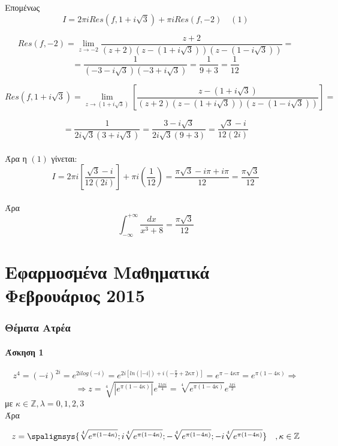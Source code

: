 \documentclass[12pt]{article}
\begin{document}
Επομένως $$ Ι= 2 \pi i Res(f,1+i\sqrt{3})+ \pi i Res(f,-2)\quad (1) $$

$$  Res(f,-2)=\lim_{z\to -2}\frac{z+2}{(z+2)(z-(1+i\sqrt{3}))(z-(1-i\sqrt{3}))}=$$
$$=\frac{1}{(-3-i\sqrt{3})(-3+i\sqrt{3})}=\frac{1}{9+3}=\frac{1}{12}$$

$$ Res(f,1+i\sqrt{3})=\lim_{z\to (1+i\sqrt{3})} \left[ \frac{z-(1+i\sqrt{3})}{(z+2)(z-(1+i\sqrt{3}))(z-(1-i\sqrt{3}))} \right]= $$

$$=\frac{1}{2i\sqrt{3}(3+i\sqrt{3})}= \frac{3-i\sqrt{3}}{2i\sqrt{3}(9+3)} = \frac{\sqrt{3}-i}{12(2i)}  $$
\\
Άρα η $(1)$ γίνεται:
\\
$$ Ι=2\pi i \left[ \frac{\sqrt{3}-i}{12(2i)} \right] + \pi i \left( \frac{1}{12} \right) =
\frac{\pi \sqrt{3}-i\pi+i\pi}{12} = \frac{\pi \sqrt{3}}{12}$$
\\
Άρα $$ \int_{-\infty}^{+\infty} \frac{dx}{x^3+8}= \frac{\pi \sqrt{3}}{12} $$
\newpage



\newpage \part{Εφαρμοσμένα Μαθηματικά Φεβρουάριος 2015}
\author{}


  

\maketitle
\newpage
 

 \section{Θέματα Ατρέα}
 \subsection{Άσκηση 1}
$$z^4=(-i)^{2i}=e^{2ilog(-i)}=e^{2i[ln(|-i|)+i(-\frac{\pi}{2}+2 \kappa \pi)]}=e^{\pi-4\kappa \pi}=e^{\pi(1-4\kappa)}\Rightarrow
$$
$$\Rightarrow
z=\sqrt[4]{|e^{\pi(1-4\kappa)}|}e^{\frac{2\lambda\pi i}{4}}
=\sqrt[4]{e^{\pi(1-4\kappa)}}e^{\frac{\lambda\pi i}{2}}
$$με $\kappa\in \mathbb{Z},\lambda={0,1,2,3}$ 
\\
Άρα

\[
z= 
\spalignsys 
{\sqrt[4]{e^{\pi(1-4\kappa)}};
i\sqrt[4]{e^{\pi(1-4\kappa)}};
-\sqrt[4]{e^{\pi(1-4\kappa)}};
-i\sqrt[4]{e^{\pi(1-4\kappa)}}
 }
 \quad,\kappa \in \mathbb{Z}
\]
\newpage
\end{document}
